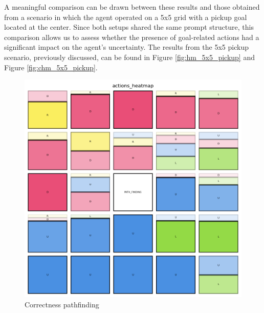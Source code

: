 A meaningful comparison can be drawn between these results and those obtained from
a scenario in which the agent operated on a 5x5 grid with a pickup goal located at
the center. Since both setups shared the same prompt structure, this comparison allows
us to assess whether the presence of goal-related actions had a significant impact
on the agent's uncertainty. The results from the 5x5 pickup scenario, previously
discussed, can be found in Figure \ref{fig:hm_5x5_pickup} and Figure
\ref{fig:chm_5x5_pickup}.

\begin{figure}[h!]
  \centering
  \begin{minipage}[b]{0.45\textwidth}
    \centering
    \includegraphics[width=\textwidth]{
      images/results_discussion/path_finding/actions_heatmap.png
    }
    \caption{Correctness pathfinding }
    \label{fig:path_finding_hm}
  \end{minipage}
  \hfill
  \begin{minipage}[b]{0.45\textwidth}
    \centering

\end{minipage}
\end{figure}
